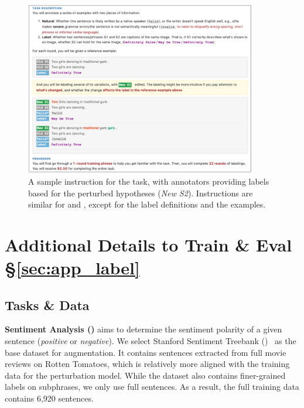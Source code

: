 \begin{figure}
\centering
\includegraphics[width=0.9\textwidth]{figures/mturk_instruction.pdf}
\vspace{-15pt}
\caption{A sample instruction for the \nli task, with annotators providing labels based for the perturbed hypotheses (\emph{New S2}). Instructions are similar for \qqp and \sst, except for the label definitions and the examples. }
\vspace{-10pt}
\label{fig:mturk_instruction_detail}

\end{figure}

\section{Additional Details to Train \& Eval \S\ref{sec:app_label}}
\label{appendix:app_label}

\subsection{Tasks \& Data}

\textbf{Sentiment Analysis (\sst)} aims to determine the sentiment polarity of a given sentence (\emph{positive} or \emph{negative}). 
We select Stanford Sentiment Treebank (\dsst)~\cite{socher2013recursive} as the base dataset for augmentation.
It contains sentences extracted from full movie reviews on Rotten Tomatoes, which is relatively more aligned with the training data for the perturbation model. 
While the dataset also contains finer-grained labels on subphrases, we only use full sentences.
As a result, the full training data contains 6,920 sentences.

